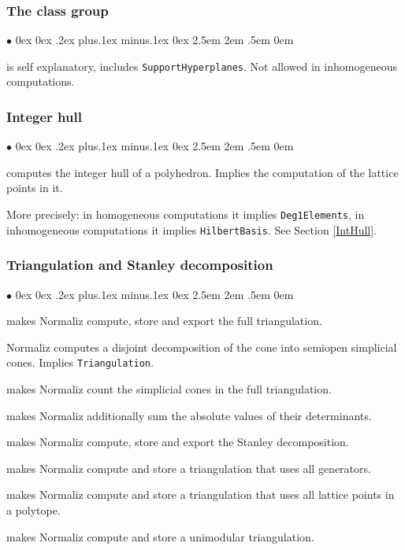 \documentclass[12pt,a4paper]{scrartcl}
\newcommand{\stdli}{ \topsep0ex \partopsep0ex %
\parsep.2ex plus.1ex minus.1ex \itemsep0ex%
\leftmargin2.5em \labelwidth2em \labelsep.5em \rightmargin0em}%
\renewenvironment{itemize}{\begin{list}{{$\bullet$}}{\stdli}}{\end{list}}
\theoremstyle{definition}
\def\itemtt[#1]{\item[\textbf{\ttt{#1}}]}
\def\ttt{\texttt}
\begin{document}
\subsubsection{The class group}

\begin{itemize}
	\itemtt [ClassGroup, -C] is self explanatory, includes \verb|SupportHyperplanes|. Not allowed in inhomogeneous computations.
\end{itemize}

\subsubsection{Integer hull}

\begin{itemize}
	\itemtt [IntegerHull, -H] computes the integer hull of a polyhedron. Implies the computation of the lattice points in it.
\end{itemize}

More precisely: in homogeneous computations it implies \verb|Deg1Elements|, in inhomogeneous computations it implies \verb|HilbertBasis|. See Section \ref{IntHull}.

\subsubsection{Triangulation and Stanley decomposition}

\begin{itemize}
	
	\itemtt[Triangulation, -T] makes Normaliz compute, store and export the full triangulation.
	
	\itemtt[ConeDecomposition, -D] Normaliz computes a disjoint decomposition of the cone into semiopen simplicial cones. Implies \verb|Triangulation|.
	
	\itemtt[TriangulationSize, -t] makes Normaliz count the simplicial cones in the full triangulation.
	
	\itemtt[TriangulationDetSum] makes Normaliz additionally sum the absolute values of their determinants.
	
	\itemtt[StanleyDec, -y] makes Normaliz compute, store and export the Stanley decomposition.
	
	\itemtt[AllGeneratorsTriangulation] makes Normaliz compute and store a triangulation that uses all generators.
	
	\itemtt[LatticePointTriangulation] makes Normaliz compute and store a triangulation that uses all lattice points in a polytope.
	
	\itemtt[UnimodularTriangulation] makes Normaliz compute and store a unimodular triangulation.
	
\end{itemize}
\end{document}
